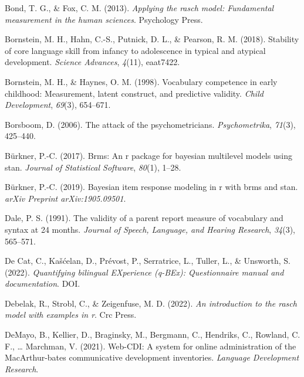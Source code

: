 \documentclass[
  man,floatsintext]{apa6}
\newlength{\cslhangindent}
\newlength{\cslentryspacingunit} %
\newenvironment{CSLReferences}[2] %
 {%
  \setlength{\parindent}{0pt}
  \ifodd #1
  \let\oldpar\par
  \def\par{\hangindent=\cslhangindent\oldpar}
  \fi
  \setlength{\parskip}{#2\cslentryspacingunit}
 }%
 {}
\begin{document}
\begin{CSLReferences}{1}{0}
\leavevmode{}%
Bond, T. G., \& Fox, C. M. (2013). \emph{Applying the rasch model: Fundamental measurement in the human sciences}. Psychology Press.

\leavevmode{}%
Bornstein, M. H., Hahn, C.-S., Putnick, D. L., \& Pearson, R. M. (2018). Stability of core language skill from infancy to adolescence in typical and atypical development. \emph{Science Advances}, \emph{4}(11), eaat7422.

\leavevmode{}%
Bornstein, M. H., \& Haynes, O. M. (1998). Vocabulary competence in early childhood: Measurement, latent construct, and predictive validity. \emph{Child Development}, \emph{69}(3), 654--671.

\leavevmode{}%
Borsboom, D. (2006). The attack of the psychometricians. \emph{Psychometrika}, \emph{71}(3), 425--440.

\leavevmode{}%
Bürkner, P.-C. (2017). Brms: An r package for bayesian multilevel models using stan. \emph{Journal of Statistical Software}, \emph{80}(1), 1--28.

\leavevmode{}%
Bürkner, P.-C. (2019). Bayesian item response modeling in r with brms and stan. \emph{arXiv Preprint arXiv:1905.09501}.

\leavevmode{}%
Dale, P. S. (1991). The validity of a parent report measure of vocabulary and syntax at 24 months. \emph{Journal of Speech, Language, and Hearing Research}, \emph{34}(3), 565--571.

\leavevmode{}%
De Cat, C., Kašćelan, D., Prévost, P., Serratrice, L., Tuller, L., \& Unsworth, S. (2022). \emph{Quantifying bilingual EXperience (q-BEx): Questionnaire manual and documentation}. DOI.

\leavevmode{}%
Debelak, R., Strobl, C., \& Zeigenfuse, M. D. (2022). \emph{An introduction to the rasch model with examples in r}. Crc Press.

\leavevmode{}%
DeMayo, B., Kellier, D., Braginsky, M., Bergmann, C., Hendriks, C., Rowland, C. F., \ldots{} Marchman, V. (2021). Web-CDI: A system for online administration of the MacArthur-bates communicative development inventories. \emph{Language Development Research}.


\end{CSLReferences}
\end{document}
